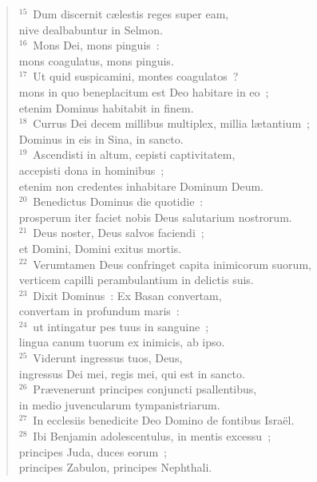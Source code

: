 \begin{flushleft}
\begin{verse}
${}^{15}$~Dum discernit c\ae lestis reges super eam,\\ nive dealbabuntur in Selmon.\\
${}^{16}$~Mons Dei, mons pinguis~:\\ mons coagulatus, mons pinguis.\\
${}^{17}$~Ut quid suspicamini, montes coagulatos~?\\ mons in quo beneplacitum est Deo habitare in eo~;\\ etenim Dominus habitabit in finem.\\
${}^{18}$~Currus Dei decem millibus multiplex, millia l\ae tantium~;\\ Dominus in eis in Sina, in sancto.\\
${}^{19}$~Ascendisti in altum, cepisti captivitatem,\\ accepisti dona in hominibus~;\\ etenim non credentes inhabitare Dominum Deum.\\
${}^{20}$~Benedictus Dominus die quotidie~:\\ prosperum iter faciet nobis Deus salutarium nostrorum.\\
${}^{21}$~Deus noster, Deus salvos faciendi~;\\ et Domini, Domini exitus mortis.\\
${}^{22}$~Verumtamen Deus confringet capita inimicorum suorum,\\ verticem capilli perambulantium in delictis suis.\\
${}^{23}$~Dixit Dominus~: Ex Basan convertam,\\ convertam in profundum maris~:\\
${}^{24}$~ut intingatur pes tuus in sanguine~;\\ lingua canum tuorum ex inimicis, ab ipso.\\
${}^{25}$~Viderunt ingressus tuos, Deus,\\ ingressus Dei mei, regis mei, qui est in sancto.\\
${}^{26}$~Pr\ae venerunt principes conjuncti psallentibus,\\ in medio juvencularum tympanistriarum.\\
${}^{27}$~In ecclesiis benedicite Deo Domino de fontibus Isra\"el.\\
${}^{28}$~Ibi Benjamin adolescentulus, in mentis excessu~;\\ principes Juda, duces eorum~;\\ principes Zabulon, principes Nephthali.\\

\end{verse}
\end{flushleft}
